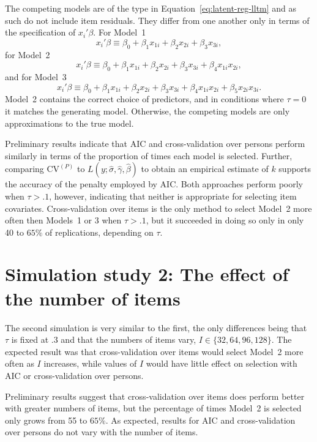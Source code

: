 The competing models are of the type in Equation~\ref{eq:latent-reg-lltm} and as such do not include item residuals. They differ from one another only in terms of the specification of $x_i'\beta$. For Model~1
\begin{equation} 
	x_i'\beta \equiv \beta_0 + \beta_1 x_{1i} + \beta_2 x_{2i} + \beta_3 x_{3i}
,\end{equation}
for Model~2
\begin{equation} 
	x_i'\beta \equiv \beta_0 + \beta_1 x_{1i} + \beta_2 x_{2i} + \beta_3 x_{3i} + 
		\beta_4 x_{1i} x_{2i}
,\end{equation}
and for Model~3
\begin{equation} 
	x_i'\beta \equiv \beta_0 + \beta_1 x_{1i} + \beta_2 x_{2i} + \beta_3 x_{3i} + 
		\beta_4 x_{1i} x_{2i} + \beta_5 x_{2i} x_{3i}
.\end{equation}
Model~2 contains the correct choice of predictors, and in conditions where $\tau=0$ it matches the generating model. Otherwise, the competing models are only approximations to the true model.

Preliminary results indicate that AIC and cross-validation over persons perform similarly in terms of the proportion of times each model is selected. Further, comparing $\mathrm{CV}^{(P)}$ to $L(y ; \hat \sigma, \hat \gamma, \hat \beta)$ to obtain an empirical estimate of $k$ supports the accuracy of the penalty employed by AIC. Both approaches perform poorly when $\tau > .1$, however, indicating that neither is appropriate for selecting item covariates. Cross-validation over items is the only method to select Model~2 more often then Models~1 or 3 when $\tau > .1$, but it succeeded in doing so only in only 40 to $65\%$ of replications, depending on $\tau$.


\section{Simulation study 2: The effect of the number of items}

The second simulation is very similar to the first, the only differences being that $\tau$ is fixed at .3 and that the numbers of items vary, $I \in \{32, 64, 96, 128 \}$. The expected result was that cross-validation over items would select Model~2 more often as $I$ increases, while values of $I$ would have little effect on selection with AIC or cross-validation over persons.

Preliminary results suggest that cross-validation over items does perform better with greater numbers of items, but the percentage of times Model~2 is selected only grows from 55 to $65\%$. As expected, results for AIC and cross-validation over persons do not vary with the number of items.


